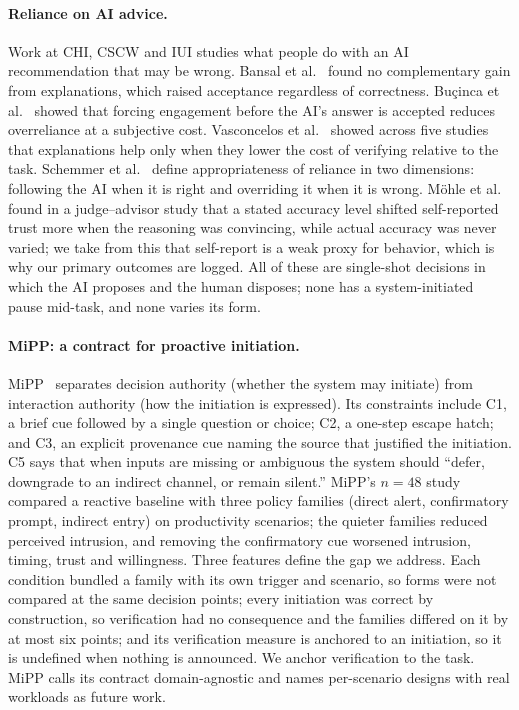 \documentclass[sigconf,nonacm]{acmart}
\begin{document}
\paragraph{Reliance on AI advice.}
Work at CHI, CSCW and IUI studies what people do with an AI recommendation
that may be wrong. Bansal et al.~\cite{bansal2021} found no complementary
gain from explanations, which raised acceptance regardless of correctness.
Bu\c{c}inca et al.~\cite{bucinca2021} showed that forcing engagement before
the AI's answer is accepted reduces overreliance at a subjective cost.
Vasconcelos et al.~\cite{vasconcelos2023} showed across five studies that
explanations help only when they lower the cost of verifying relative to
the task. Schemmer et al.~\cite{schemmer2023} define appropriateness of
reliance in two dimensions: following the AI when it is right and
overriding it when it is wrong. M\"ohle et al.~\cite{mohle2026} found in a
judge--advisor study that a stated accuracy level shifted self-reported
trust more when the reasoning was convincing, while actual accuracy was
never varied; we take from this that self-report is a weak proxy for
behavior, which is why our primary outcomes are logged. All of these are
single-shot decisions in which the AI proposes and the human disposes; none
has a system-initiated pause mid-task, and none varies its form.

\paragraph{MiPP: a contract for proactive initiation.}
MiPP~\cite{sanchezadame2026} separates decision authority (whether the
system may initiate) from interaction authority (how the initiation is
expressed). Its constraints include C1, a brief cue followed by a single
question or choice; C2, a one-step escape hatch; and C3, an explicit
provenance cue naming the source that justified the initiation. C5 says
that when inputs are missing or ambiguous the system should ``defer,
downgrade to an indirect channel, or remain silent.'' MiPP's $n{=}48$
study compared a reactive baseline with three policy families (direct
alert, confirmatory prompt, indirect entry) on productivity scenarios; the
quieter families reduced perceived intrusion, and removing the
confirmatory cue worsened intrusion, timing, trust and willingness. Three
features define the gap we address. Each condition bundled a family with
its own trigger and scenario, so forms were not compared at the same
decision points; every initiation was correct by construction, so
verification had no consequence and the families differed on it by at most
six points; and its verification measure is anchored to an initiation, so
it is undefined when nothing is announced. We anchor verification to the
task. MiPP calls its contract domain-agnostic and names per-scenario
designs with real workloads as future work.
\end{document}

